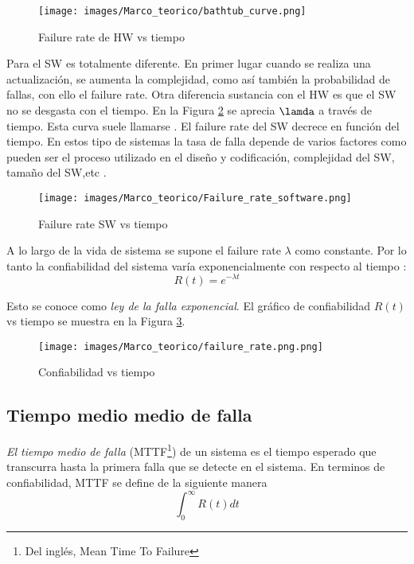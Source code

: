 \begin{figure}[h]
 \centering
 \texttt{[image: images/Marco\_teorico/bathtub\_curve.png]}
  \caption{Failure rate de HW vs tiempo }
\label{fig:bathtub_curve}
\end{figure}

Para el \ac{SW} es totalmente diferente. En primer lugar cuando se realiza una actualización, se aumenta la complejidad, como así también la probabilidad de fallas,
con ello el failure rate. Otra diferencia sustancia con el \ac{HW} es que el \ac{SW} no se desgasta con el tiempo. En la Figura \ref{fig:Failure_rate_software}
se aprecia $\lamda$ a través de tiempo. Esta curva suele llamarse . El failure rate del \ac{SW} decrece en función del tiempo. En estos tipo de sistemas
la tasa de falla depende de varios factores como pueden ser el proceso utilizado en el diseño y codificación, complejidad del \ac{SW}, tamaño del \ac{SW},etc \cite{FTDesign}.

\begin{figure}[h]
 \centering
 \texttt{[image: images/Marco\_teorico/Failure\_rate\_software.png]}
  \caption{Failure rate SW vs tiempo }
\label{fig:Failure_rate_software}
\end{figure}

A lo largo de la vida de sistema se supone el failure rate $\lambda$ como constante. Por lo tanto la confiabilidad del sistema varía exponencialmente
con respecto al tiempo \cite{FTDesign}: $$R(t) = e^{- \lambda t}$$

Esto se conoce como \textit{ley de la falla exponencial}\cite{FTDesign}. El gráfico de confiabilidad $R(t)$ vs tiempo se muestra en la Figura \ref{fig:failure_rate}.

\begin{figure}[h]
 \centering
 \texttt{[image: images/Marco\_teorico/failure\_rate.png.png]}
  \caption{Confiabilidad vs tiempo }
\label{fig:failure_rate}
\end{figure}

\subsection{Tiempo medio medio de falla}
\textit{El tiempo medio de falla} (MTTF\footnote{Del inglés, Mean Time To Failure}) de un sistema es el tiempo esperado que transcurra hasta la primera falla que se
detecte en el sistema. En terminos de confiabilidad, MTTF se define de la siguiente manera \cite{FTDesign} $$\int_0^{\infty} R(t) dt$$

